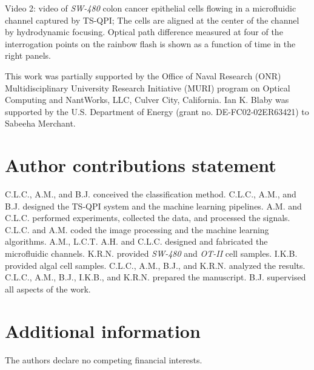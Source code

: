 \documentclass[aps,pra,reprint,superscriptaddress]{revtex4-1}
\begin{document}
Video 2: video of \textit{SW-480} colon cancer epithelial cells flowing in a microfluidic channel captured by TS-QPI; The cells are aligned at the center of the channel by hydrodynamic focusing. Optical path difference measured at four of the interrogation points on the rainbow flash is shown as a function of time in the right panels.

\begin{acknowledgments}
This work was partially supported by the Office of Naval Research (ONR) Multidisciplinary University Research Initiative (MURI) program on Optical Computing and NantWorks, LLC, Culver City, California. Ian K. Blaby was supported by the U.S. Department of Energy (grant no. DE-FC02-02ER63421) to Sabeeha Merchant.
\end{acknowledgments}

\section*{Author contributions statement}

C.L.C., A.M., and B.J. conceived the classification method. C.L.C., A.M., and B.J. designed the TS-QPI system and the machine learning pipelines. A.M. and C.L.C. performed experiments, collected the data, and processed the signals. C.L.C. and A.M. coded the image processing and the machine learning algorithms. A.M., L.C.T. A.H. and C.L.C. designed and fabricated the microfluidic channels. K.R.N. provided \textit{SW-480} and \textit{OT-II} cell samples. I.K.B. provided algal cell samples. C.L.C., A.M., B.J., and K.R.N. analyzed the results. C.L.C., A.M., B.J., I.K.B., and K.R.N. prepared the manuscript. B.J. supervised all aspects of the work.

\section*{Additional information}

The authors declare no competing financial interests.
\end{document}
